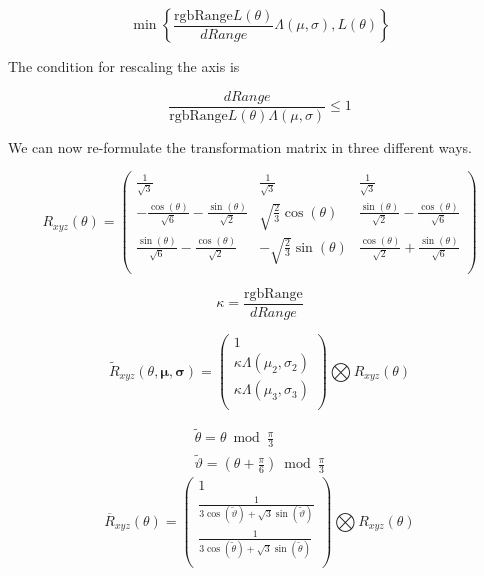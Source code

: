 \begin{equation}\label{eq:RescaleAxis}
\min\left\{ \frac{\text{rgbRange} L(\theta)}{dRange} \Lambda(\mu,\sigma) , L(\theta) \right\}
\end{equation}

The condition for rescaling the axis is

\begin{equation}\label{eq:RescaleAxisCondition}
\frac{dRange}{\text{rgbRange} L(\theta) \Lambda(\mu,\sigma)} \le 1
\end{equation}

We can now re-formulate the transformation matrix in three different ways.

\begin{equation}\label{eq:Rotation}
 R_{xyz}(\theta) = \left(
\begin{array}{ccc}
 \frac{1}{\sqrt{3}} & \frac{1}{\sqrt{3}} & \frac{1}{\sqrt{3}} \\
 -\frac{\cos (\theta )}{\sqrt{6}}-\frac{\sin (\theta )}{\sqrt{2}} &
 \sqrt{\frac{2}{3}} \cos (\theta ) &
 \frac{\sin (\theta )}{\sqrt{2}}-\frac{\cos (\theta )}{\sqrt{6}} \\
 \frac{\sin (\theta )}{\sqrt{6}}-\frac{\cos (\theta )}{\sqrt{2}} &
 -\sqrt{\frac{2}{3}} \sin (\theta ) &
 \frac{\cos (\theta )}{\sqrt{2}}+\frac{\sin (\theta )}{\sqrt{6}} \\
\end{array}
\right)
\end{equation}

\begin{equation}\label{eq:RequestedComprerssion}
\kappa = \frac{\text{rgbRange} }{dRange}
\end{equation}

\begin{equation}\label{eq:CompressedRotation}
 \widetilde{R}_{xyz}(\theta,\mathbf{\mu},\mathbf{\sigma}) =
\left(
\begin{array}{c}
 1  \\
 \kappa \Lambda(\mu_2,\sigma_2) \\
 \kappa \Lambda(\mu_3,\sigma_3) \\
\end{array}
\right)
\bigotimes
R_{xyz}(\theta)
\end{equation}

\begin{gather*}
  \widetilde{\theta} = \theta  \bmod \frac{\pi }{3} \\
\widetilde{\vartheta} = \left(\theta +\frac{\pi }{6}\right) \bmod \frac{\pi }{3}
\end{gather*}
\begin{equation}\label{eq:NormRxyz2}
 \overline{R}_{xyz}(\theta) =
\left(
\begin{array}{c}
 1  \\
 \frac{1}{3 \cos \left(\widetilde{\vartheta}\right)+\sqrt{3} \sin \left(\widetilde{\vartheta}\right)} \\
 \frac{1}{3 \cos \left(\widetilde{\theta}\right)+\sqrt{3} \sin \left(\widetilde{\theta}\right)}  \\
\end{array}
\right)
\bigotimes
R_{xyz}(\theta)
\end{equation}

